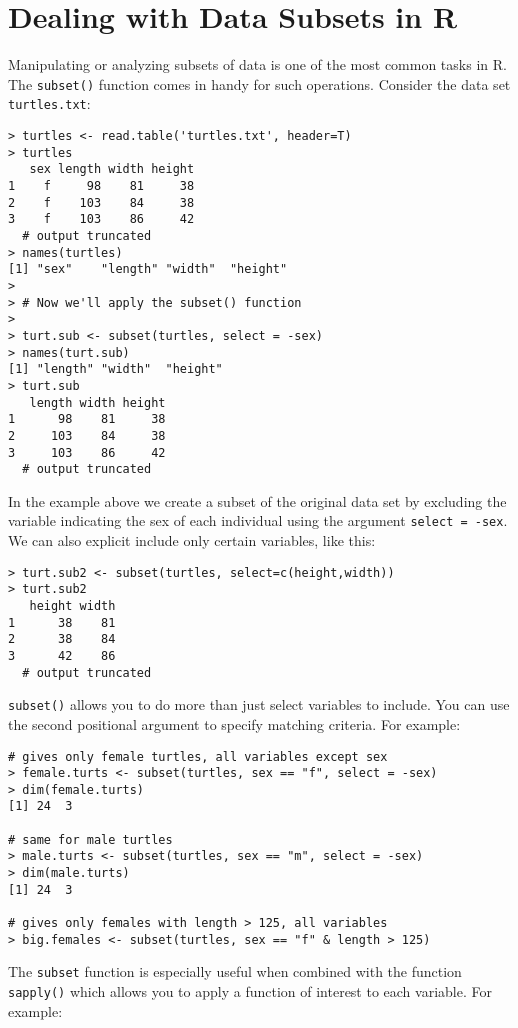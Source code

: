 \section{Dealing with Data Subsets in R}

Manipulating or analyzing subsets of data is one of the most common
tasks in R. The \lstinline!subset()! function comes in handy for such
operations. Consider the data set \lstinline!turtles.txt!:

\begin{lstlisting}
> turtles <- read.table('turtles.txt', header=T)
> turtles
   sex length width height
1    f     98    81     38
2    f    103    84     38
3    f    103    86     42
  # output truncated
> names(turtles)
[1] "sex"    "length" "width"  "height"
>
> # Now we'll apply the subset() function
>
> turt.sub <- subset(turtles, select = -sex)
> names(turt.sub)
[1] "length" "width"  "height"
> turt.sub
   length width height
1      98    81     38
2     103    84     38
3     103    86     42
  # output truncated
\end{lstlisting}
In the example above we create a subset of the original data set by
excluding the variable indicating the sex of each individual using the
argument \lstinline!select = -sex!. We can also explicit include only
certain variables, like this:

\begin{lstlisting}
> turt.sub2 <- subset(turtles, select=c(height,width))
> turt.sub2
   height width
1      38    81
2      38    84
3      42    86
  # output truncated    
\end{lstlisting}
\lstinline!subset()! allows you to do more than just select variables to
include. You can use the second positional argument to specify matching
criteria. For example:

\begin{lstlisting}
# gives only female turtles, all variables except sex
> female.turts <- subset(turtles, sex == "f", select = -sex)
> dim(female.turts)
[1] 24  3

# same for male turtles
> male.turts <- subset(turtles, sex == "m", select = -sex)
> dim(male.turts)
[1] 24  3

# gives only females with length > 125, all variables
> big.females <- subset(turtles, sex == "f" & length > 125)    
\end{lstlisting}
The \lstinline!subset! function is especially useful when combined with
the function \lstinline!sapply()! which allows you to apply a function
of interest to each variable. For example:

